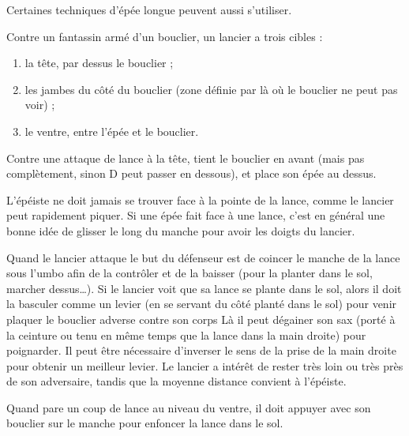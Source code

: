 Certaines techniques d'épée longue peuvent aussi s'utiliser.

Contre un fantassin armé d'un bouclier, un lancier a trois cibles :
\begin{enumerate}
	\item la tête, par dessus le bouclier ;
	\item les jambes du côté du bouclier (zone définie par là où le bouclier ne peut pas voir) ;
	\item le ventre, entre l'épée et le bouclier.
\end{enumerate}


\begin{garde}
Contre une attaque de lance à la tête, \D tient le bouclier en avant (mais pas complètement, sinon D peut passer en dessous), et place son épée au dessus.

\end{garde}


L'épéiste ne doit jamais se trouver face à la pointe de la lance, comme le lancier peut rapidement piquer.
Si une épée fait face à une lance, c'est en général une bonne idée de glisser le long du manche pour avoir les doigts du lancier.

Quand le lancier attaque le but du défenseur est de coincer le manche de la lance sous l'umbo afin de la contrôler et de la baisser (pour la planter dans le sol, marcher dessus…).
Si le lancier voit que sa lance se plante dans le sol, alors il doit la basculer comme un levier (en se servant du côté planté dans le sol) pour venir plaquer le bouclier adverse contre son corps
Là il peut dégainer son sax (porté à la ceinture ou tenu en même temps que la lance dans la main droite) pour poignarder.
Il peut être nécessaire d'inverser le sens de la prise de la main droite pour obtenir un meilleur levier.
Le lancier a intérêt de rester très loin ou très près de son adversaire, tandis que la moyenne distance convient à l'épéiste.


\begin{technique}
Quand \D pare un coup de lance au niveau du ventre, il doit appuyer avec son bouclier sur le manche pour enfoncer la lance dans le sol.

\end{technique}


